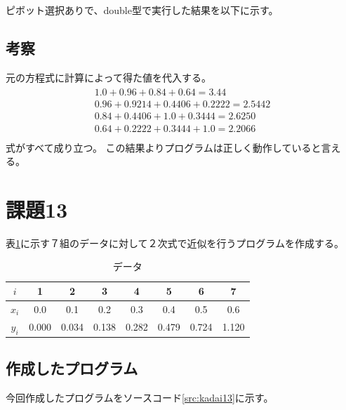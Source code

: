 \documentclass[11pt,titlepage]{jsarticle}
\begin{document}
\begin{oframed}
\end{oframed}

ピボット選択ありで、double型で実行した結果を以下に示す。

\begin{oframed}
\end{oframed}

\subsection{考察}
元の方程式に計算によって得た値を代入する。
\begin{eqnarray}
\label{eq:gauss_pivot_result}
		\begin{array}{l}
			1.0 + 0.96 + 0.84 + 0.64 = 3.44\\
			0.96 + 0.9214 + 0.4406 + 0.2222 = 2.5442\\
			0.84 + 0.4406 + 1.0 + 0.3444 = 2.6250\\
			0.64 + 0.2222 + 0.3444 + 1.0 = 2.2066\\
		\end{array}
\end{eqnarray}
式がすべて成り立つ。
この結果よりプログラムは正しく動作していると言える。

\section{課題13}
表\ref{table:kadai13}に示す７組のデータに対して２次式で近似を行うプログラムを作成する。


\begin{table}[H]
\caption{データ}
\label{table:kadai13}
\centering
\begin{tabular}{|c|c|c|c|c|c|c|c|}\hline
	$i$&1&2&3&4&5&6&7 \\ \hline
	$x_i$&0.0&0.1&0.2&0.3&0.4&0.5&0.6 \\ \hline
	$y_i$&0.000&0.034&0.138&0.282&0.479&0.724&1.120\\ \hline
\end{tabular}
\end{table}


\subsection{作成したプログラム}
今回作成したプログラムをソースコード\ref{src:kadai13}に示す。
\end{document}
